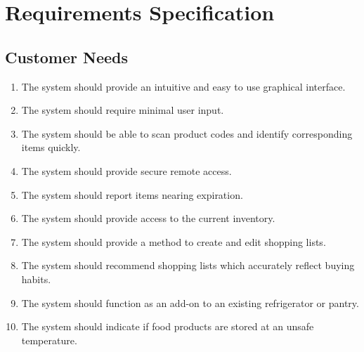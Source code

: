 \documentclass[11pt]{article} %
\begin{document}
\section{Requirements Specification}
\subsection{Customer Needs}
\begin{enumerate}
\item The system should provide an intuitive and easy to use graphical interface.
\item The system should require minimal user input.
\item The system should be able to scan product codes and identify corresponding items quickly.
\item The system should provide secure remote access.
\item The system should report items nearing expiration.
\item The system should provide access to the current inventory.
\item The system should provide a method to create and edit shopping lists.
\item The system should recommend shopping lists which accurately reflect buying habits.
\item The system should function as an add-on to an existing refrigerator or pantry.
\item The system should indicate if food products are stored at an unsafe temperature.
\end{enumerate}
\pagebreak
\end{document}
